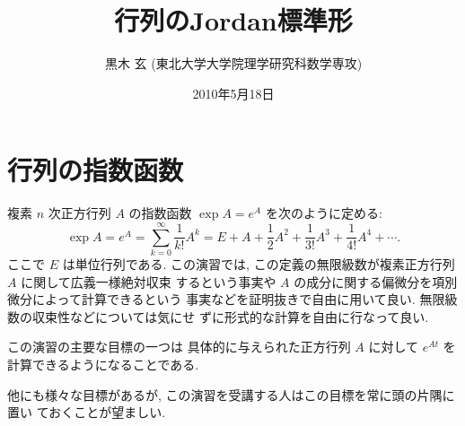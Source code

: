 \documentclass[12pt,twoside]{jarticle}
\begin{document}

\title{\bf 行列のJordan標準形}

\author{黒木 玄 \quad (東北大学大学院理学研究科数学専攻)}

\date{2010年5月18日}

\maketitle

\tableofcontents


\section{行列の指数函数}
\label{sec:exp}

複素 $n$ 次正方行列 $A$ の指数函数 $\exp A = e^A$ を次のように定める:
\begin{equation*}
  \exp A = e^A 
  = \sum_{k=0}^\infty \frac{1}{k!} A^k
  = E + A + \frac{1}{2}A^2 + \frac{1}{3!}A^3 + \frac{1}{4!}A^4 + \cdots.
\end{equation*}
ここで $E$ は単位行列である.
この演習では, この定義の無限級数が複素正方行列 $A$ に関して広義一様絶対収束
するという事実や $A$ の成分に関する偏微分を項別微分によって計算できるという
事実などを証明抜きで自由に用いて良い.  無限級数の収束性などについては気にせ
ずに形式的な計算を自由に行なって良い.

\bigskip

{\Large この演習の主要な目標の一つは
具体的に与えられた正方行列 $A$ に対して $e^{At}$ を
計算できるようになることである.}

\bigskip

他にも様々な目標があるが, この演習を受講する人はこの目標を常に頭の片隅に置い
ておくことが望ましい.

\end{document}
